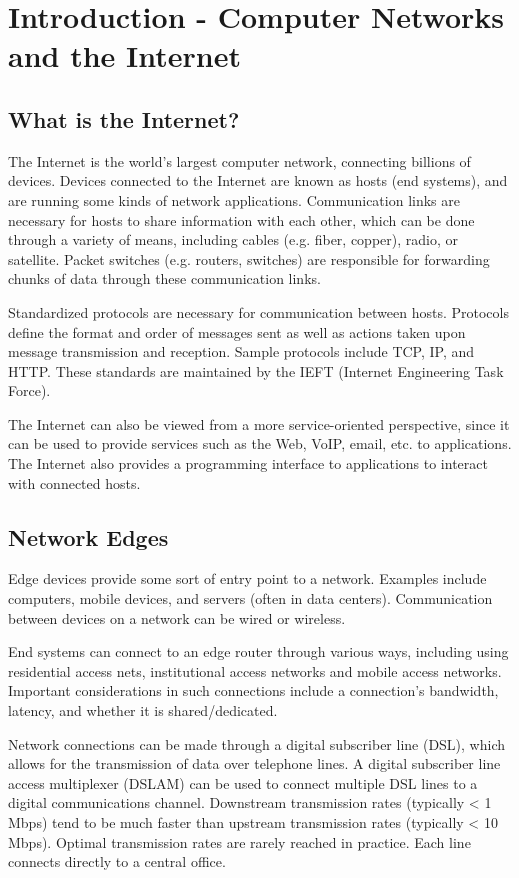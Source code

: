 \documentclass[12pt,titlepage]{article}
\begin{document}
  \section{Introduction - Computer Networks and the Internet}
    \subsection{What is the Internet?}
      The Internet is the world's largest computer network, connecting billions of devices. Devices
      connected to the Internet are known as hosts (end systems), and are running some kinds of network applications.
      Communication links are necessary for hosts to share information with each other, which can be done through
      a variety of means, including cables (e.g. fiber, copper), radio, or satellite. Packet switches (e.g. routers,
      switches) are responsible for forwarding chunks of data through these communication links.

      Standardized protocols are necessary for communication between hosts. Protocols define the format and order of
      messages sent as well as actions taken upon message transmission and reception. Sample protocols include TCP, IP, and HTTP.
      These standards are maintained by the IEFT (Internet Engineering Task Force).

      The Internet can also be viewed from a more service-oriented perspective, since it can be used to provide
      services such as the Web, VoIP, email, etc. to applications. The Internet also provides a programming interface
      to applications to interact with connected hosts.

    \subsection{Network Edges}
      Edge devices provide some sort of entry point to a network. Examples include computers, mobile devices, and servers
      (often in data centers). Communication between devices on a network can be wired or wireless.

      End systems can connect to an edge router through various ways, including using residential access nets, institutional
      access networks and mobile access networks. Important considerations in such connections include a connection's bandwidth,
      latency, and whether it is shared/dedicated.

      Network connections can be made through a digital subscriber line (DSL), which allows for the transmission of data over
      telephone lines. A digital subscriber line access multiplexer (DSLAM) can be used to connect multiple DSL lines to a digital
      communications channel. Downstream transmission rates (typically < 1 Mbps) tend to be much faster than upstream transmission
      rates (typically < 10 Mbps). Optimal transmission rates are rarely reached in practice. Each line connects directly to a
      central office.
\end{document}
